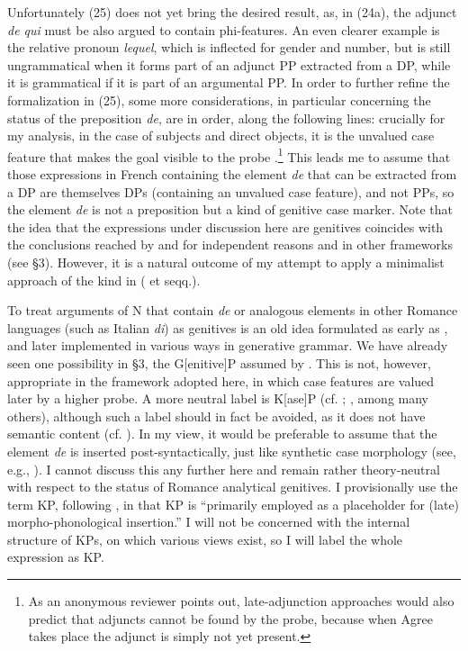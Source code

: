 \documentclass[output=paper]{langsci/langscibook}
\begin{document}
Unfortunately (25) does not yet bring the desired result, as, in (24a), the adjunct \textit{de qui} must be also argued to contain phi-features. An even clearer example is the relative pronoun \textit{lequel}, which is inflected for gender and number, but is still ungrammatical when it forms part of an adjunct PP extracted from a DP, while it is grammatical if it is part of an argumental PP. In order to further refine the formalization in (25), some more considerations, in particular concerning the status of the preposition \textit{de}, are in order, along the following lines: crucially for my analysis, in the case of subjects and direct objects, it is the unvalued case feature that makes the goal visible to the probe \citep[123]{Chomsky2000}.\footnote{As an anonymous reviewer points out, late-adjunction approaches would also predict that adjuncts cannot be found by the probe, because when Agree takes place the adjunct is simply not yet present.} This leads me to assume that those expressions in French containing the element \textit{de} that can be extracted from a DP are themselves DPs (containing an unvalued case feature), and not PPs, so the element \textit{de} is not a preposition but a kind of genitive case marker. Note that the idea that the expressions under discussion here are genitives coincides with the conclusions reached by \citet{Gutiérrez-Bravo2001} and \citet{Cinque2014} for independent reasons and in other frameworks (see §3). However, it is a natural outcome of my attempt to apply a minimalist approach of the kind in \citeauthor{Chomsky2000} (\citeyear{Chomsky2000} et seqq.).

To treat arguments of N that contain \textit{de} or analogous elements in other Romance languages (such as Italian \textit{di}) as genitives is an old idea formulated as early as \citet{Benveniste1966}, and later implemented in various ways in generative grammar. We have already seen one possibility in §3, the G[enitive]P assumed by \citet{Cinque2014}. This is not, however, appropriate in the framework adopted here, in which case features are valued later by a higher probe. A more neutral label is K[ase]P (cf. \citealt{Bittner1996}; \citealt{Neeleman1999}, among many others), although such a label should in fact be avoided, as it does not have semantic content (cf. \citealt{Chomsky1995}). In my view, it would be preferable to assume that the element \textit{de} is inserted post-syntactically, just like synthetic case morphology (see, e.g., \citealt{Marchis2018}). I cannot discuss this any further here and remain rather theory-neutral with respect to the status of Romance analytical genitives. I provisionally use the term KP, following \citet[23]{Biggs2014}, in that KP is “primarily employed as a placeholder for (late) morpho-phonological insertion.” I will not be concerned with the internal structure of KPs, on which various views exist, so I will label the whole expression as KP.
\end{document}
